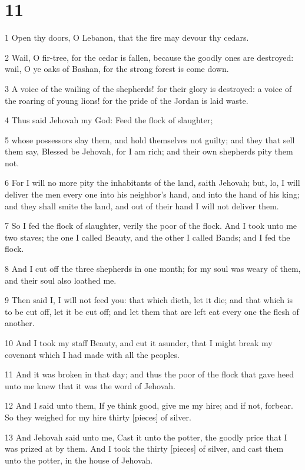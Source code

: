 \chapter{11}

\par 1 Open thy doors, O Lebanon, that the fire may devour thy cedars.
\par 2 Wail, O fir-tree, for the cedar is fallen, because the goodly ones are destroyed: wail, O ye oaks of Bashan, for the strong forest is come down.
\par 3 A voice of the wailing of the shepherds! for their glory is destroyed: a voice of the roaring of young lions! for the pride of the Jordan is laid waste.
\par 4 Thus said Jehovah my God: Feed the flock of slaughter;
\par 5 whose possessors slay them, and hold themselves not guilty; and they that sell them say, Blessed be Jehovah, for I am rich; and their own shepherds pity them not.
\par 6 For I will no more pity the inhabitants of the land, saith Jehovah; but, lo, I will deliver the men every one into his neighbor's hand, and into the hand of his king; and they shall smite the land, and out of their hand I will not deliver them.
\par 7 So I fed the flock of slaughter, verily the poor of the flock. And I took unto me two staves; the one I called Beauty, and the other I called Bands; and I fed the flock.
\par 8 And I cut off the three shepherds in one month; for my soul was weary of them, and their soul also loathed me.
\par 9 Then said I, I will not feed you: that which dieth, let it die; and that which is to be cut off, let it be cut off; and let them that are left eat every one the flesh of another.
\par 10 And I took my staff Beauty, and cut it asunder, that I might break my covenant which I had made with all the peoples.
\par 11 And it was broken in that day; and thus the poor of the flock that gave heed unto me knew that it was the word of Jehovah.
\par 12 And I said unto them, If ye think good, give me my hire; and if not, forbear. So they weighed for my hire thirty [pieces] of silver.
\par 13 And Jehovah said unto me, Cast it unto the potter, the goodly price that I was prized at by them. And I took the thirty [pieces] of silver, and cast them unto the potter, in the house of Jehovah.
